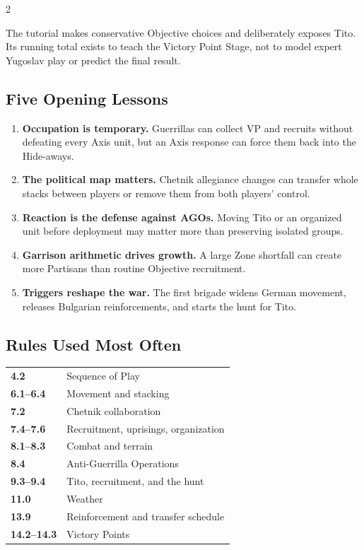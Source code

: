 \begin{multicols}{2}
\begin{commentarybox}[title={Do not read 24 VP as a forecast}]
The tutorial makes conservative Objective choices and deliberately exposes
Tito. Its running total exists to teach the Victory Point Stage, not to model
expert Yugoslav play or predict the final result.
\end{commentarybox}

\columnbreak

\subsection{Five Opening Lessons}

\begin{enumerate}[leftmargin=1.4em,itemsep=3pt]
  \item \textbf{Occupation is temporary.} Guerrillas can collect VP and
    recruits without defeating every Axis unit, but an Axis response can force
    them back into the Hide-aways.
  \item \textbf{The political map matters.} Chetnik allegiance changes can
    transfer whole stacks between players or remove them from both players'
    control.
  \item \textbf{Reaction is the defense against AGOs.} Moving Tito or an
    organized unit before deployment may matter more than preserving isolated
    groups.
  \item \textbf{Garrison arithmetic drives growth.} A large Zone shortfall can
    create more Partisans than routine Objective recruitment.
  \item \textbf{Triggers reshape the war.} The first brigade widens German
    movement, releases Bulgarian reinforcements, and starts the hunt for Tito.
\end{enumerate}

\subsection{Rules Used Most Often}

\begin{tabularx}{\linewidth}{@{}>{\bfseries}l X@{}}
  4.2 & Sequence of Play \\
  6.1--6.4 & Movement and stacking \\
  7.2 & Chetnik collaboration \\
  7.4--7.6 & Recruitment, uprisings, organization \\
  8.1--8.3 & Combat and terrain \\
  8.4 & Anti-Guerrilla Operations \\
  9.3--9.4 & Tito, recruitment, and the hunt \\
  11.0 & Weather \\
  13.9 & Reinforcement and transfer schedule \\
  14.2--14.3 & Victory Points \\
\end{tabularx}
\end{multicols}

